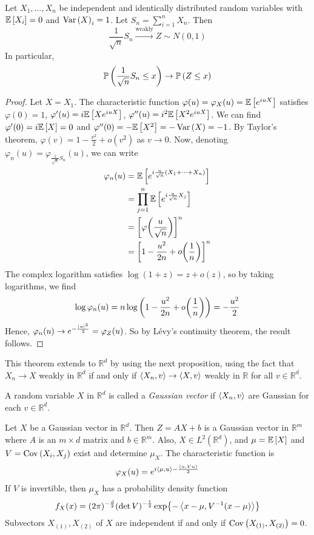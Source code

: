 \begin{theorem}
	Let \( X_1, \dots, X_n \) be independent and identically distributed random variables with \( \mathbb{E}\left[{X_i}\right] = 0 \) and \( \operatorname{Var}\left({X}\right)_i = 1 \).
	Let \( S_n = \sum_{i=1}^n X_n \).
	Then
	\[ \frac{1}{\sqrt{n}} S_n \xrightarrow{\text{weakly}} Z \sim N(0,1) \]
	In particular,
	\[ \mathbb{P}\left({\frac{1}{\sqrt{n}} S_n \leq x}\right) \to \mathbb{P}\left({Z \leq x}\right) \]
\end{theorem}
\begin{proof}
	Let \( X = X_1 \).
	The characteristic function \( \varphi(u) = \varphi_X(u) = \mathbb{E}\left[{e^{iuX}}\right] \) satisfies \( \varphi(0) = 1 \), \( \varphi'(u) = i \mathbb{E}\left[{X e^{iuX}}\right] \), \( \varphi''(u) = i^2 \mathbb{E}\left[{X^2 e^{iuX}}\right] \).
	We can find \( \varphi'(0) = i\mathbb{E}\left[{X}\right] = 0 \) and \( \varphi''(0) = -\mathbb{E}\left[{X^2}\right] = -\operatorname{Var}\left({X}\right) = -1 \).
	By Taylor's theorem, \( \varphi(v) = 1 - \frac{v^2}{2} + o(v^2) \) as \( v \to 0 \).
	Now, denoting \( \varphi_n(u) = \varphi_{\frac{1}{\sqrt n} S_n}(u) \), we can write
	\begin{align*}
		\varphi_n(u) &= \mathbb{E}\left[{e^{i\frac{u}{\sqrt n} (X_1 + \dots + X_n)}}\right] \\
		&= \prod_{j=1}^n \mathbb{E}\left[{e^{i\frac{u}{\sqrt n} X_j}}\right] \\
		&= \qty[\varphi\qty(\frac{u}{\sqrt n})]^n \\
		&= \qty[1 - \frac{u^2}{2n} + o\qty(\frac{1}{n})]^n
	\end{align*}
	The complex logarithm satisfies \( \log(1 + z) = z + o(z) \), so by taking logarithms, we find
	\[ \log \varphi_n(u) = n \log\qty(1 - \frac{u^2}{2n} + o\qty(\frac{1}{n})) = -\frac{u^2}{2} \]
	Hence, \( \varphi_n(u) \to e^{-\frac{\abs{u}^2}{2}} = \varphi_Z(u) \).
	So by L\'evy's continuity theorem, the result follows.
\end{proof}
\begin{remark}
	This theorem extends to \( \mathbb R^d \) by using the next proposition, using the fact that \( X_n \to X \) weakly in \( \mathbb R^d \) if and only if \( \left\langle{X_n, v}\right\rangle \to \left\langle{X, v}\right\rangle \) weakly in \( \mathbb R \) for all \( v \in \mathbb R^d \).
\end{remark}
\begin{definition}
	A random variable \( X \) in \( \mathbb R^d \) is called a \emph{Gaussian vector} if \( \left\langle{X_n, v}\right\rangle \) are Gaussian for each \( v \in \mathbb R^d \).
\end{definition}
\begin{proposition}
	Let \( X \) be a Gaussian vector in \( \mathbb R^d \).
	Then \( Z = AX + b \) is a Gaussian vector in \( \mathbb R^m \) where \( A \) is an \( m \times d \) matrix and \( b \in \mathbb R^m \).
	Also, \( X \in L^2(\mathbb R^d) \), and \( \mu = \mathbb{E}\left[{X}\right] \) and \( V = \operatorname{Cov}\left({X_i, X_j}\right) \) exist and determine \( \mu_X \).
	The characteristic function is
	\[ \varphi_X(u) = e^{i\left\langle{\mu,u}\right\rangle - \frac{\left\langle{u,Vu}\right\rangle}{2}} \]
	If \( V \) is invertible, then \( \mu_X \) has a probability density function
	\[ f_X(x) = (2\pi)^{-\frac{d}{2}} (\det V)^{-\frac{1}{2}} \exp{-\left\langle{x-\mu, V^{-1}(x - \mu)}\right\rangle} \]
	Subvectors \( X_{(1)}, X_{(2)} \) of \( X \) are independent if and only if \( \operatorname{Cov}\left({X_{(1)}, X_{(2)}}\right) = 0 \).
\end{proposition}
